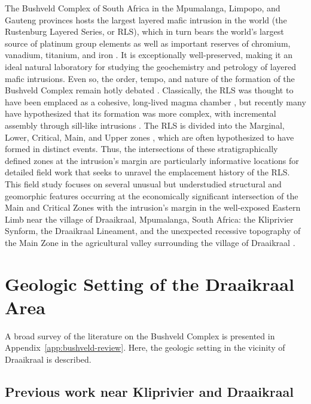 The Bushveld Complex of South Africa in the Mpumalanga, Limpopo, and Gauteng provinces 
hosts the largest layered mafic intrusion in the world (the Rustenburg Layered Series, or RLS), which in 
turn bears the world's largest source of platinum group elements \citep{lee1996} as well as important reserves of chromium, vanadium, titanium, and iron \citep{cawthorn2015}. 
It is exceptionally well-preserved, making it an ideal natural laboratory for studying the geochemistry 
and petrology of layered mafic intrusions. Even so, the order, tempo, and nature of the formation of the
Bushveld Complex remain hotly debated \citep{kruger2020,mungall2016,scoates2021}. Classically, the RLS was thought to have been emplaced as a cohesive, long-lived magma chamber \citep{kruger1994,cawthorn2015},
but recently many have hypothesized that its formation was more complex, with incremental assembly through sill-like intrusions \citep{mitchell2019,yaoetal2021,scoon2023,bourdeau2023}. 
The RLS is divided into the Marginal, Lower, Critical, Main, and Upper zones \citep{vongruenewaldt1985}, 
which are often hypothesized to have formed in distinct events. Thus, the intersections of these stratigraphically
defined zones at the intrusion's margin are particularly informative
locations for detailed field work that seeks to unravel the emplacement history of the RLS. This field study focuses on several
unusual but understudied structural and geomorphic features occurring at
the economically significant intersection of the Main and Critical Zones
with the intrusion's margin in the well-exposed Eastern Limb near the
village of Draaikraal, Mpumalanga, South Africa: the Kliprivier Synform,
the Draaikraal Lineament, and the unexpected recessive topography of the
Main Zone in the agricultural valley surrounding the village of
Draaikraal \citep{vandermerwe2007,molyneux2008}.

\section{Geologic Setting of the Draaikraal Area}
\label{sec:ch5-geological-background}

A broad survey of the literature on the Bushveld Complex is presented in Appendix~\ref{app:bushveld-review}.
Here, the geologic setting in the vicinity of Draaikraal is described.

\subsection{Previous work near Kliprivier and Draaikraal}
\label{sec:ch5-previous-work-near-kliprivier-and-draaikraal}

